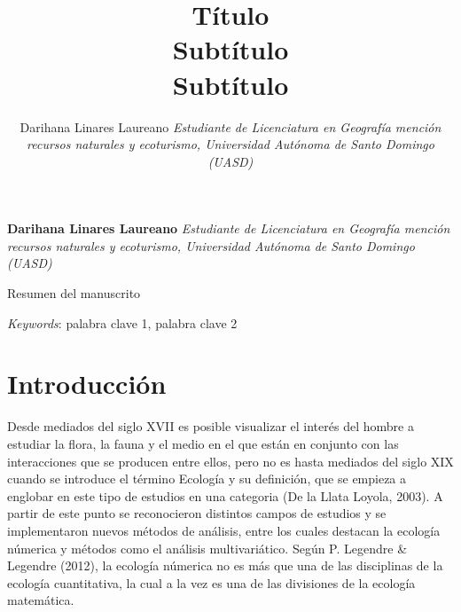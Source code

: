 \documentclass[11pt,]{article}
\title{Título\\
Subtítulo\\
Subtítulo  }
\author{\Large Darihana Linares Laureano\vspace{0.05in} \newline\normalsize\emph{Estudiante de Licenciatura en Geografía mención recursos naturales y
ecoturismo, Universidad Autónoma de Santo Domingo (UASD)}  }
\date{}
\newcommand*{\authorfont}{\fontfamily{phv}\selectfont}
\renewenvironment{abstract}
 {{%
    \setlength{\leftmargin}{0mm}
    \setlength{\rightmargin}{\leftmargin}%
  }%
  \relax}
 {\endlist}
\begin{document}
	
%

{%
\setlength{\parindent}{0pt}
\thispagestyle{plain}
{\fontsize{18}{20}\selectfont\raggedright 
\maketitle  %

}

{
   \vskip 13.5pt\relax \normalsize\fontsize{11}{12} 
\textbf{\authorfont Darihana Linares Laureano} \hskip 15pt \emph{\small Estudiante de Licenciatura en Geografía mención recursos naturales y
ecoturismo, Universidad Autónoma de Santo Domingo (UASD)}   

}

}








\begin{abstract}

    \hbox{\vrule height .2pt width 39.14pc}

    \vskip 8.5pt %

\noindent Resumen del manuscrito


\vskip 8.5pt \noindent \emph{Keywords}: palabra clave 1, palabra clave 2 \par

    \hbox{\vrule height .2pt width 39.14pc}



\end{abstract}


\vskip 6.5pt


\noindent  \section{Introducción}\label{introducciuxf3n}

Desde mediados del siglo XVII es posible visualizar el interés del
hombre a estudiar la flora, la fauna y el medio en el que están en
conjunto con las interacciones que se producen entre ellos, pero no es
hasta mediados del siglo XIX cuando se introduce el término Ecología y
su definición, que se empieza a englobar en este tipo de estudios en una
categoria (De la Llata Loyola, 2003). A partir de este punto se
reconocieron distintos campos de estudios y se implementaron nuevos
métodos de análisis, entre los cuales destacan la ecología númerica y
métodos como el análisis multivariático. Según P. Legendre \& Legendre
(2012), la ecología númerica no es más que una de las disciplinas de la
ecología cuantitativa, la cual a la vez es una de las divisiones de la
ecología matemática.
\end{document}
